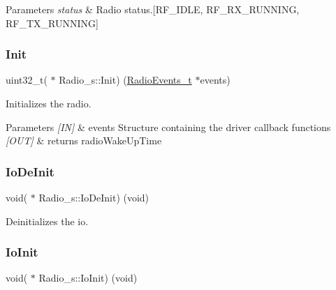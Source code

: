 \begin{DoxyParams}{Parameters}
{\em status} & Radio status.\mbox{[}R\+F\+\_\+\+I\+D\+LE, R\+F\+\_\+\+R\+X\+\_\+\+R\+U\+N\+N\+I\+NG, R\+F\+\_\+\+T\+X\+\_\+\+R\+U\+N\+N\+I\+NG\mbox{]} \\
\hline
\end{DoxyParams}
\mbox{\label{group__LORA_gafb896d98cceb49c55af00f5d5aa964cd}} 
\subsubsection{\texorpdfstring{Init}{Init}}
{\footnotesize\ttfamily uint32\+\_\+t( $\ast$ Radio\+\_\+s\+::\+Init) (\hyperlink{structRadioEvents__t}{Radio\+Events\+\_\+t} $\ast$events)}



Initializes the radio. 


\begin{DoxyParams}{Parameters}
{\em \mbox{[}\+I\+N\mbox{]}} & events Structure containing the driver callback functions \\
\hline
{\em \mbox{[}\+O\+U\+T\mbox{]}} & returns radio\+Wake\+Up\+Time \\
\hline
\end{DoxyParams}
\mbox{\label{group__LORA_ga45d0a08fcddbc5d8364ce980c26028ac}} 
\subsubsection{\texorpdfstring{Io\+De\+Init}{IoDeInit}}
{\footnotesize\ttfamily void( $\ast$ Radio\+\_\+s\+::\+Io\+De\+Init) (void)}



Deinitializes the io. 

\mbox{\label{group__LORA_ga5a84db3f810c3c6470a330034981fc7b}} 
\subsubsection{\texorpdfstring{Io\+Init}{IoInit}}
{\footnotesize\ttfamily void( $\ast$ Radio\+\_\+s\+::\+Io\+Init) (void)}



